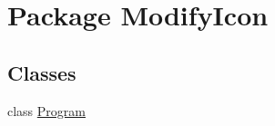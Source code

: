 \hypertarget{namespace_modify_icon}{\section{Package Modify\-Icon}
\label{namespace_modify_icon}
}
\subsection*{Classes}
\begin{DoxyCompactItemize}
\item 
class \hyperlink{class_modify_icon_1_1_program}{Program}
\end{DoxyCompactItemize}
